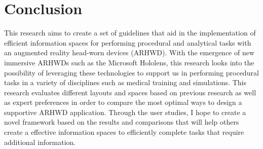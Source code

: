 \section{Conclusion}
\label{sec:conclusion}
This research aims to create a set of guidelines that aid in the implementation of efficient information spaces for performing procedural and analytical tasks with an augmented reality head-worn devices (ARHWD). With the emergence of new immersive ARHWDs such as the Microsoft Hololens, this research looks into the possibility of leveraging these technologies to support us in performing procedural tasks in a variety of disciplines such as medical training and simulations. This research evaluates different layouts and spaces based on previous research as well as expert preferences in order to compare the most optimal ways to design a supportive ARHWD application. Through the user studies, I hope to create a novel framework based on the results and comparisons that will help others create a effective information spaces to efficiently complete tasks that require additional information.